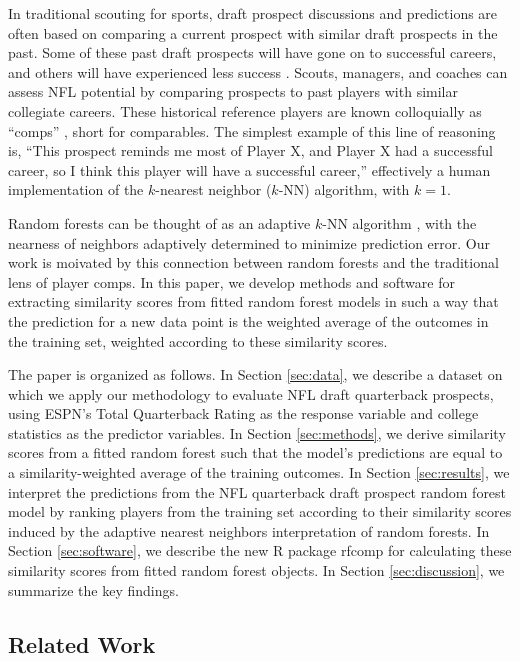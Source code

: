 \documentclass{article}
\begin{document}
In traditional scouting for sports, draft prospect discussions and predictions are often based on comparing a current prospect with similar draft prospects in the past. Some of these past draft prospects will have gone on to successful careers, and others will have experienced less success \citep{trapasso_nfl_2025}. Scouts, managers, and coaches can assess NFL potential by comparing prospects to past players with similar collegiate careers. These historical reference players are known colloquially as ``comps'' \citep{jones_nfl_2025}, short for comparables. The simplest example of this line of reasoning is, ``This prospect reminds me most of Player X, and Player X had a successful career, so I think this player will have a successful career,'' effectively a human implementation of the $k$-nearest neighbor ($k$-NN) algorithm, with $k = 1$.

Random forests can be thought of as an adaptive $k$-NN algorithm \citep{lin_random_2006}, with the nearness of neighbors adaptively determined to minimize prediction error. Our work is moivated by this connection between random forests and the traditional lens of player comps. In this paper, we develop methods and software for extracting similarity scores from fitted random forest models in such a way that the prediction for a new data point is the weighted average of the outcomes in the training set, weighted according to these similarity scores.

The paper is organized as follows. In Section \ref{sec:data}, we describe a dataset on which we apply our methodology to evaluate NFL draft quarterback prospects, using ESPN's Total Quarterback Rating as the response variable and college statistics as the predictor variables. In Section \ref{sec:methods}, we derive similarity scores from a fitted random forest such that the model's predictions are equal to a similarity-weighted average of the training outcomes. In Section \ref{sec:results}, we interpret the predictions from the NFL quarterback draft prospect random forest model by ranking players from the training set according to their similarity scores induced by the adaptive nearest neighbors interpretation of random forests. In Section \ref{sec:software}, we describe the new R package rfcomp for calculating these similarity scores from fitted random forest objects. In Section \ref{sec:discussion}, we summarize the key findings.

\subsection{Related Work}
\end{document}
